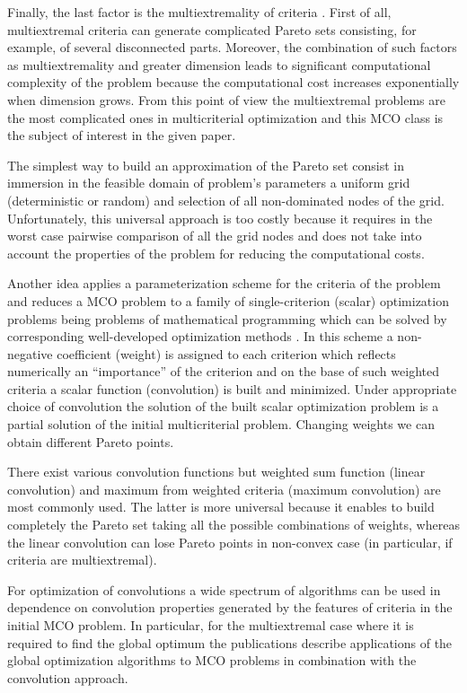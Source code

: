 \documentclass[]{interact}
\theoremstyle{plain}%
\theoremstyle{definition}
\theoremstyle{remark}
\begin{document}
Finally, the last factor is the multiextremality of criteria \cite{Pardalos2017}. First of all, multiextremal criteria can generate complicated Pareto sets consisting, for example, of several disconnected parts. Moreover, the combination of such factors as multiextremality and greater dimension leads to significant computational complexity of the problem because the computational cost increases exponentially when dimension grows. From this point of view the multiextremal problems are the most complicated ones in multicriterial optimization and this MCO class is the subject of interest in the given paper. 

The simplest way to build an approximation of the Pareto set consist in immersion in the feasible domain of problem's parameters a uniform grid (deterministic or random) and selection of all non-dominated nodes of the grid. Unfortunately, this universal approach is too costly because it requires in the worst case pairwise comparison of all the grid nodes and does not take into account the properties of the problem for reducing the computational costs.

Another idea applies a parameterization scheme for the criteria of the problem and reduces a MCO problem to a family of single-criterion (scalar) optimization problems being problems of mathematical programming which can be solved by corresponding well-developed optimization methods \cite{Collette2004,Ehrgott2005}. In this scheme a non-negative coefficient (weight) is assigned to each criterion which reflects numerically an ``importance'' of the criterion and on the base of such weighted criteria a scalar function (convolution) is built and minimized. Under appropriate choice of convolution the solution of the built scalar optimization problem is a partial solution of the initial multicriterial problem. Changing weights we can obtain different Pareto points. 

There exist various convolution functions but weighted sum function (linear convolution) and maximum from weighted criteria (maximum convolution) are most commonly used. The latter is more universal because it enables to build completely the Pareto set taking all the possible combinations of weights, whereas the linear convolution can lose Pareto points in non-convex case (in particular, if criteria are multiextremal).

For optimization of convolutions a wide spectrum of algorithms can be used in dependence on convolution properties generated by the features of criteria in the initial MCO problem. In particular, for the multiextremal case where it is required to find the global optimum the publications \cite{Evtushenko2014,Zilinskas2015,GERGEL2017_1,Gergel2019_2,Barkalov2021} describe applications of the global optimization algorithms to MCO problems in combination with the convolution approach.
\end{document}
